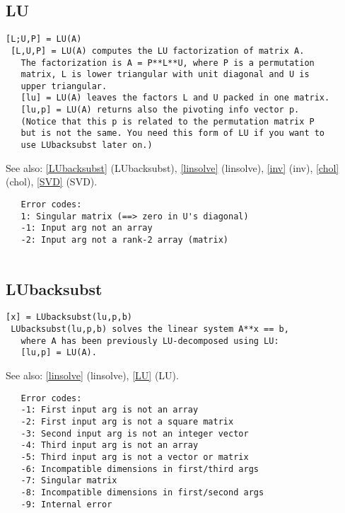 \documentclass[a4paper]{article}
\begin{document}
\subsection{LU\label{LU}}

\begin{tscreen}
\begin{verbatim}
[L;U,P] = LU(A)
 [L,U,P] = LU(A) computes the LU factorization of matrix A.
   The factorization is A = P**L**U, where P is a permutation
   matrix, L is lower triangular with unit diagonal and U is
   upper triangular.
   [lu] = LU(A) leaves the factors L and U packed in one matrix.
   [lu,p] = LU(A) returns also the pivoting info vector p.
   (Notice that this p is related to the permutation matrix P
   but is not the same. You need this form of LU if you want to
   use LUbacksubst later on.)
\end{verbatim}

See also: \ref{LUbacksubst} {(LUbacksubst)}, \ref{linsolve} {(linsolve)}, \ref{inv} {(inv)}, \ref{chol} {(chol)}, \ref{SVD} {(SVD)}.
\begin{verbatim}
   Error codes:
   1: Singular matrix (==> zero in U's diagonal)
   -1: Input arg not an array
   -2: Input arg not a rank-2 array (matrix)
   
\end{verbatim}
\end{tscreen}





\subsection{LUbacksubst\label{LUbacksubst}}

\begin{tscreen}
\begin{verbatim}
[x] = LUbacksubst(lu,p,b)
 LUbacksubst(lu,p,b) solves the linear system A**x == b,
   where A has been previously LU-decomposed using LU:
   [lu,p] = LU(A).
\end{verbatim}

See also: \ref{linsolve} {(linsolve)}, \ref{LU} {(LU)}.
\begin{verbatim}
   Error codes:
   -1: First input arg is not an array
   -2: First input arg is not a square matrix
   -3: Second input arg is not an integer vector
   -4: Third input arg is not an array
   -5: Third input arg is not a vector or matrix
   -6: Incompatible dimensions in first/third args
   -7: Singular matrix
   -8: Incompatible dimensions in first/second args
   -9: Internal error
\end{verbatim}
\end{tscreen}
\end{document}

